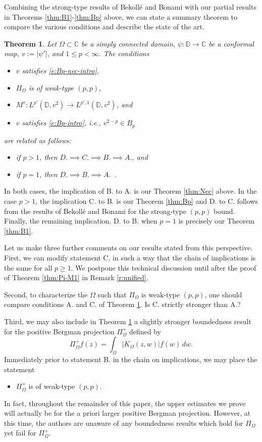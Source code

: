 \documentclass{amsart}
\newcommand{\abs}[1]{\left\vert {#1}\right\vert}
\newtheorem{theorem}{Theorem}[section]
\theoremstyle{definition}
\numberwithin{equation}{section}
\begin{document}
Combining the strong-type results of Bekoll\'e and Bonami with our partial results in Theorems \ref{thm:B1}-\ref{thm:Bp} above, we can state a summary theorem to compare the various conditions and describe the state of the art.
\begin{theorem}\label{thm:summ}
    Let $\Omega \subset \mathbb{C}$ be a simply connected domain, $\psi \colon \mathbb{D} \rightarrow \mathbb{C}$ be a conformal map, $v:= |\psi'|$, and $1\leq p< \infty$. The conditions
    \begin{itemize}
        \item[A.] $v$ satisfies \eqref{e:Bp-nec-intro}, 
        \item[B.] $\Pi_\Omega$ is of weak-type $(p,p)$,
        \item[C.] $M^v \colon L^{p'}(\mathbb D,v^2) \to L^{p',1}(\mathbb D,v^2)$, and
        \item[D.] $v$ satisfies \eqref{e:Bp-intro}, i.e., $v^{2-p} \in B_p$
    \end{itemize}
    are related as follows: 
    \begin{itemize}
 	\item[I.] if $p>1$, then $D. \implies C. \implies B. \implies A.$, and 
 	\item[II.] if $p=1$, then $D. \implies B. \implies A.$\, .
 	\end{itemize}
\end{theorem}
In both cases, the implication of B. to A. is our Theorem \ref{thm:Nec} above. In the case $p>1$, the implication C. to B. is our Theorem \ref{thm:Bp} and D. to C. follows from the results of Bekoll\'e and Bonami for the strong-type $(p,p)$ bound. Finally, the remaining implication, D. to B. when $p=1$ is precisely our Theorem \ref{thm:B1}. 

Let us make three further comments on our results stated from this perspective. First, we can modify statement C. in such a way that the chain of implications is the same for all $p \ge 1$. We postpone this technical discussion until after the proof of Theorem \ref{thm:Pi-M1} in Remark \ref{r:unified}.

Second, to characterize the $\Omega$ such that $\Pi_\Omega$ is weak-type $(p,p)$, one should compare conditions A. and C. of Theorem \ref{thm:summ}. Is C. strictly stronger than A.? 

Third, we may also include in Theorem \ref{thm:summ} a slightly stronger boundedness result for the positive Bergman projection $\Pi_\Omega^+$ defined by
    \[ \Pi_\Omega^+ f (z) = \int_\Omega \abs{K_\Omega(z,w)} f(w) \, dw.\]
Immediately prior to statement B. in the chain on implications, we may place the statement
\begin{itemize}
    \item[B'.] $\Pi_\Omega^+$ is of weak-type $(p,p)$.
\end{itemize}
In fact, throughout the remainder of this paper, the upper estimates we prove will actually be for the a priori larger positive Bergman projection. However, at this time, the authors are unaware of any boundedness results which hold for $\Pi_\Omega$ yet fail for $\Pi_\Omega^+$.
\end{document}
